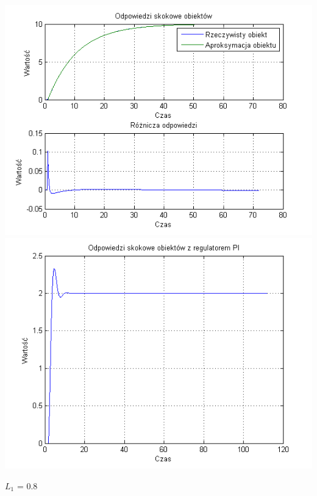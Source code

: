\documentclass[10pt,a4paper]{article}
\begin{document}
\begin{center}
\includegraphics[scale=1]{images/jeden/skrypt_219.png}\\
\includegraphics[scale=1]{images/jeden/skrypt_220.png}\\
\end{center}
\newpage
$L_1$ = 0.8
\end{document}
